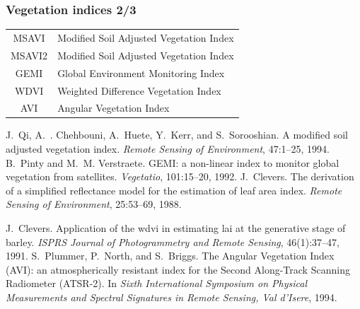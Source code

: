 \documentclass[compress]{beamer}
\begin{document}
\begin{frame}
\frametitle{Vegetation indices 2/3}
\footnotesize \centering
\begin{tabular}{|c|l|}
\hline
MSAVI & Modified Soil Adjusted Vegetation Index  \cite{Qi1994-MSAVI} \\
MSAVI2 & Modified Soil Adjusted Vegetation Index  \cite{Qi1994-MSAVI} \\
GEMI &   Global Environment Monitoring Index \cite{Pinty1992-GEMI} \\
WDVI & Weighted Difference Vegetation Index  \cite{Clevers1988-WDVI,Clevers1991-WDVI} \\ 
AVI & Angular Vegetation Index  \cite{AVI}\\
\hline
\end{tabular}
\begin{thebibliography}{noidea}
\tiny
{}
J.~Qi, A.~. Chehbouni, A.~Huete, Y.~Kerr, and S.~Sorooshian.
 A modified soil adjusted vegetation index.
 {\em Remote Sensing of Environment}, 47:1--25, 1994.
B.~Pinty and M.~M. Verstraete.
 {GEMI}: a non-linear index to monitor global vegetation from
  satellites.
 {\em Vegetatio}, 101:15--20, 1992.
J.~Clevers.
 The derivation of a simplified reflectance model for the estimation
  of leaf area index.
 {\em Remote Sensing of Environment}, 25:53--69, 1988.

J.~Clevers.
 Application of the wdvi in estimating lai at the generative stage of
  barley.
 {\em ISPRS Journal of Photogrammetry and Remote Sensing},
  46(1):37--47, 1991.
S.~Plummer, P.~North, and S.~Briggs.
 {The Angular Vegetation Index (AVI): an atmospherically resistant
  index for the Second Along-Track Scanning Radiometer (ATSR-2)}.
 In {\em Sixth International Symposium on Physical Measurements and
  Spectral Signatures in Remote Sensing, Val d'Isere}, 1994.
\end{thebibliography}
\end{frame}
\end{document}
